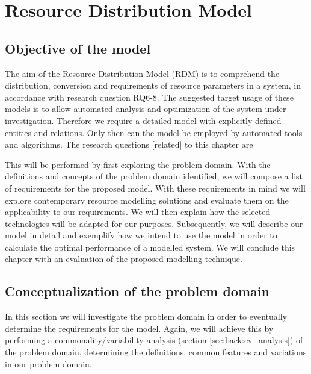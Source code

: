  

\newcommand{\rdmid}{2}
\chapter{Resource Distribution Model}
\label{ch:rdm}
\section{Objective of the model}
The aim of the Resource Distribution Model (RDM) is to comprehend the distribution, conversion and requirements of resource parameters in a system, in accordance with research question RQ6-8. The suggested target usage of these models is to allow automated analysis and optimization of the system under investigation. Therefore we require a detailed model with explicitly defined entities and relations. Only then can the model be employed by automated tools and algorithms. The research questions [related] to this chapter are 

This will be performed by first exploring the problem domain. With the definitions and concepts of the problem domain identified, we will compose a list of requirements for the proposed model. With these requirements in mind we will explore contemporary resource modelling solutions and evaluate them on the applicability to our requirements. We will then explain how the selected technologies will be adapted for our purposes. Subsequently, we will describe our model in detail and exemplify how we intend to use the model in order to calculate the optimal performance of a modelled system. We will conclude this chapter with an evaluation of the proposed modelling technique.

\section{Conceptualization of the problem domain}
\label{sec:cv_analysis}
In this section we will investigate the problem domain in order to eventually determine the requirements for the model. Again, we will achieve this by performing a commonality/variability analysis (section \ref{sec:back:cv_analysis}) of the problem domain, determining the definitions, common features and variations in our problem domain.

